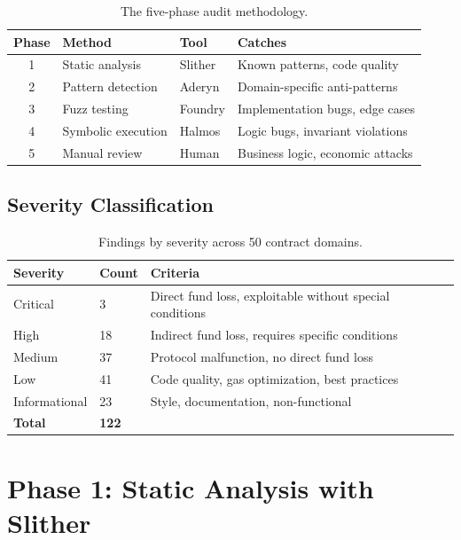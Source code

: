 \documentclass[11pt,a4paper]{article}
\begin{document}
\begin{table}[H]
\centering
\small
\begin{tabular}{@{}clll@{}}
\toprule
\textbf{Phase} & \textbf{Method} & \textbf{Tool} & \textbf{Catches} \\
\midrule
1 & Static analysis & Slither & Known patterns, code quality \\
2 & Pattern detection & Aderyn & Domain-specific anti-patterns \\
3 & Fuzz testing & Foundry & Implementation bugs, edge cases \\
4 & Symbolic execution & Halmos & Logic bugs, invariant violations \\
5 & Manual review & Human & Business logic, economic attacks \\
\bottomrule
\end{tabular}
\caption{The five-phase audit methodology.}
\end{table}

\subsection{Severity Classification}

\begin{table}[H]
\centering
\small
\begin{tabular}{@{}llp{8cm}@{}}
\toprule
\textbf{Severity} & \textbf{Count} & \textbf{Criteria} \\
\midrule
Critical & 3 & Direct fund loss, exploitable without special conditions \\
High & 18 & Indirect fund loss, requires specific conditions \\
Medium & 37 & Protocol malfunction, no direct fund loss \\
Low & 41 & Code quality, gas optimization, best practices \\
Informational & 23 & Style, documentation, non-functional \\
\midrule
\textbf{Total} & \textbf{122} & \\
\bottomrule
\end{tabular}
\caption{Findings by severity across 50 contract domains.}
\end{table}

\section{Phase 1: Static Analysis with Slither}
\end{document}
